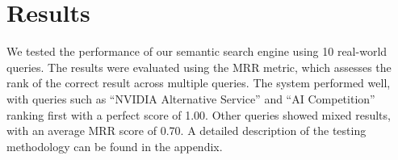 \section{Results}
We tested the performance of our semantic search engine using 10 real-world queries. The results were evaluated using the MRR metric, which assesses the rank of the correct result across multiple queries. The system performed well, with queries such as “NVIDIA Alternative Service” and “AI Competition” ranking first with a perfect score of 1.00. Other queries showed mixed results, with an average MRR score of 0.70. A detailed description of the testing methodology can be found in the appendix.

